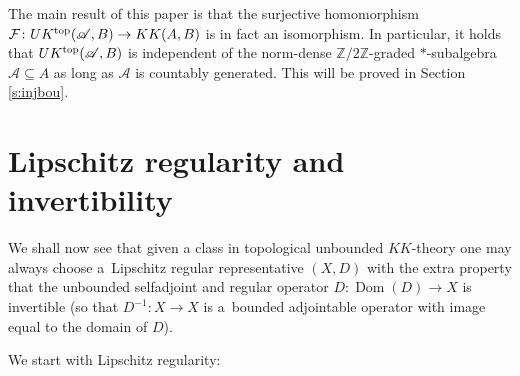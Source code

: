 \documentclass[pdftex]{sigma}
\numberwithin{equation}{section}
\newcommand{\zz}{\mathbb{Z}}
\newcommand{\C}[1]{\mathcal{#1}}
\newcommand{\s}[1]{\mathscr{#1}}
\newcommand{\su}{\subseteq}
\begin{document}
The main result of this paper is that the surjective homomorphism $\C F\colon UK^{{\rm top}}(\s A,B) \to KK(A,B)$ is in fact an isomorphism. In particular, it holds that $UK^{{\rm top}}(\s A,B)$ is independent of the norm-dense $\zz/2\zz$-graded $*$-subalgebra $\s A \su A$ as long as $\s A$ is countably generated. This will be proved in Section \ref{s:injbou}.



\section{Lipschitz regularity and invertibility}
We shall now see that given a class in topological unbounded $KK$-theory one may always choose a~Lipschitz regular representative $(X,D)$ with the extra property that the unbounded selfadjoint and regular operator $D\colon \operatorname{Dom}(D) \to X$ is invertible (so that $D^{-1}\colon X \to X$ is a~bounded adjointable operator with image equal to the domain of $D$).

We start with Lipschitz regularity:
\end{document}
